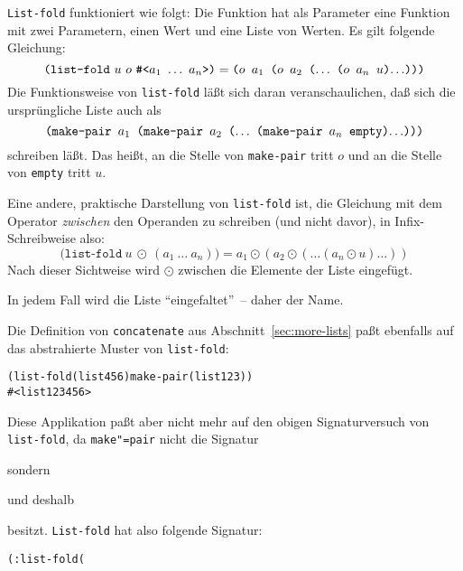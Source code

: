 \texttt{List-fold} funktioniert wie folgt: Die Funktion hat als
Parameter eine Funktion mit zwei Parametern, einen Wert und eine
Liste von Werten.  Es gilt folgende Gleichung:
%
\begin{displaymath}
  \texttt{(list-fold}~u~o~\verb|#<|a_1~\ldots~a_n\verb|>|\texttt{)}
  = \texttt{($o$ $a_1$ ($o$ $a_2$ ($\ldots$ ($o$ $a_n$ $u$)$ \ldots$)))}
\end{displaymath}
%
Die Funktionsweise von \texttt{list-fold} läßt sich daran
veranschaulichen, daß sich die ursprüngliche Liste auch als
%
\begin{displaymath}
\texttt{(make-pair $a_1$ (make-pair $a_2$ ($\ldots$ (make-pair $a_n$ empty)$ \ldots$)))}
\end{displaymath}
%
schreiben läßt.  Das heißt, an die Stelle von \texttt{make-pair} tritt
$o$ und an die Stelle von \texttt{empty} tritt $u$.

Eine andere, praktische Darstellung von 
\texttt{list-fold} ist, die Gleichung mit dem Operator
\emph{zwischen} den Operanden zu schreiben (und nicht davor), in
Infix-Schreibweise also:
%
\begin{displaymath}
  \texttt{(list-fold}~u~\odot~(a_1~\ldots~a_n)\texttt{)}
  = a_1 \odot (a_2 \odot (\ldots (a_n \odot u)\ldots ))
\end{displaymath}
%
Nach dieser Sichtweise wird $\odot$ zwischen die Elemente der Liste
eingefügt.

In jedem Fall wird die Liste "`eingefaltet"'~-- daher der Name.

Die Definition von \texttt{concatenate} aus
Abschnitt~\ref{sec:more-lists} paßt ebenfalls auf das abstrahierte
Muster von \texttt{list-fold}:
%
\begin{alltt}
(list-fold (list 4 5 6) make-pair (list 1 2 3))
\evalsto{} #<list 1 2 3 4 5 6>
\end{alltt}
%
Diese Applikation paßt aber nicht mehr auf den obigen Signaturversuch von
\texttt{list-fold}, da \texttt{make"=pair} nicht die Signatur
%
\begin{alltt}
%a %a -> %a
\end{alltt}
%
sondern
%
\begin{alltt}
%a (list-of %a) -> (list-of %a)
\end{alltt}
%
und deshalb
%
\begin{alltt}
%a %b -> %b
\end{alltt}
besitzt.  \texttt{List-fold} hat also folgende Signatur:
%
\begin{alltt}
(: list-fold (%b (%a %b -> %b) (list-of %a) -> %b)))
\end{alltt}
%

